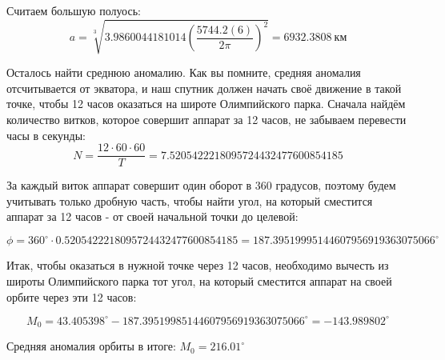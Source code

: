 Считаем большую полуось:
$$a=\sqrt[3]{3.9860044181014 \left(\frac{5744.2(6)}{2\pi}\right)^2 }=6932.3808 \: \text{км}$$

Осталось найти среднюю аномалию. Как вы помните, средняя аномалия отсчитывается от экватора, и наш 
спутник должен начать своё движение в такой точке, чтобы 12 часов оказаться на широте Олимпийского парка. 
Сначала найдём количество витков, которое совершит аппарат за 12 часов, не забываем перевести часы в секунды:
$$N = \frac{12 \cdot 60 \cdot 60}{T} = 7.5205422218095724432477600854185$$

За каждый виток аппарат совершит один оборот в 360 градусов, поэтому будем учитывать только дробную часть, 
чтобы найти угол, на который сместится аппарат за 12 часов - от своей начальной точки до целевой:

$$\phi = 360^\circ \cdot 0.5205422218095724432477600854185 = 187.39519995144607956919363075066^\circ$$

Итак, чтобы оказаться в нужной точке через 12 часов, необходимо вычесть из широты Олимпийского парка тот 
угол, на который сместится аппарат на своей орбите через эти 12 часов:

$$M_0 = 43.405398^\circ -  187.39519985144607956919363075066^\circ = -143.989802^\circ$$

Средняя аномалия орбиты в итоге: $M_0 = 216.01^\circ$

